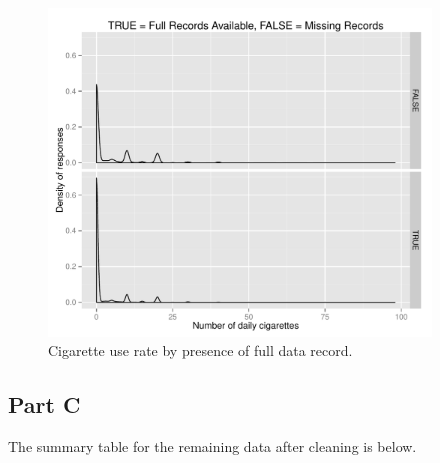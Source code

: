 \documentclass[a4paper, 12pt]{article}
\begin{document}
\begin{figure}[!h] %
   \centering
   \includegraphics[width=4in]{img/cigar-by-record-type.pdf} 
   \caption{Cigarette use rate by presence of full data record.}
   \label{fig:cigarFullData}
\end{figure}

\subsection{Part C}
The summary table for the remaining data after cleaning is below.
%
\end{document}
